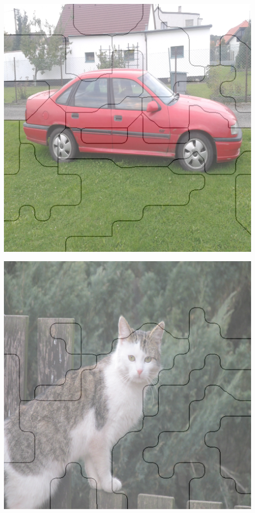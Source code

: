 \documentclass[11pt]{beamer}
\begin{document}
\begin{frame}
\begin{center}
\includegraphics[scale=0.40]{images/emb1_1_2.png}
\end{center}
\end{frame}


\begin{frame}
\begin{center}
\includegraphics[scale=0.40]{images/emb1_2_1.png}
\end{center}
\end{frame}
\end{document}

